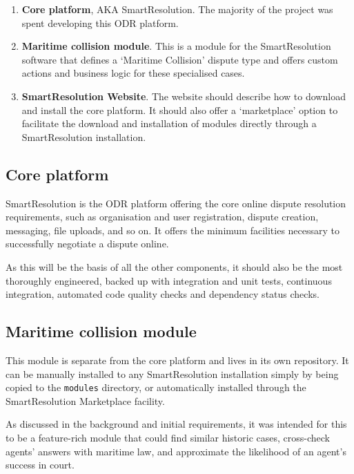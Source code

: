\begin{enumerate}
    \item \textbf{Core platform}, AKA SmartResolution. The majority of the project was spent developing this ODR platform.

    \item \textbf{Maritime collision module}. This is a module for the SmartResolution software that defines a `Maritime Collision' dispute type and offers custom actions and business logic for these specialised cases.

    \item \textbf{SmartResolution Website}. The website should describe how to download and install the core platform. It should also offer a `marketplace' option to facilitate the download and installation of modules directly through a SmartResolution installation.
\end{enumerate}

\subsection{Core platform}

SmartResolution is the ODR platform offering the core online dispute resolution requirements, such as organisation and user registration, dispute creation, messaging, file uploads, and so on. It offers the minimum facilities necessary to successfully negotiate a dispute online.

As this will be the basis of all the other components, it should also be the most thoroughly engineered, backed up with integration and unit tests, continuous integration, automated code quality checks and dependency status checks.

\subsection{Maritime collision module}

This module is separate from the core platform and lives in its own repository. It can be manually installed to any SmartResolution installation simply by being copied to the \lstinline{modules} directory, or automatically installed through the SmartResolution Marketplace facility.

As discussed in the background and initial requirements, it was intended for this to be a feature-rich module that could find similar historic cases, cross-check agents' answers with maritime law, and approximate the likelihood of an agent's success in court.

